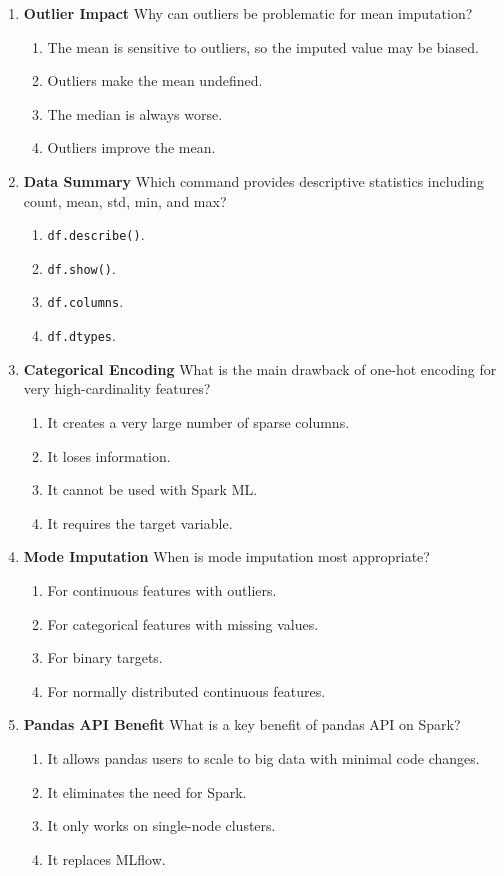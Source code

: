 \documentclass{article}
\begin{document}
\begin{enumerate}[label=\textbf{Q\arabic*.}]
		\item \textbf{Outlier Impact}
		Why can outliers be problematic for mean imputation?
		\begin{enumerate}[label=\Alph*.]
			\item The mean is sensitive to outliers, so the imputed value may be biased.
			\item Outliers make the mean undefined.
			\item The median is always worse.
			\item Outliers improve the mean.
		\end{enumerate}
		
		\item \textbf{Data Summary}
		Which command provides descriptive statistics including count, mean, std, min, and max?
		\begin{enumerate}[label=\Alph*.]
			\item \texttt{df.describe()}.
			\item \texttt{df.show()}.
			\item \texttt{df.columns}.
			\item \texttt{df.dtypes}.
		\end{enumerate}
		
		\item \textbf{Categorical Encoding}
		What is the main drawback of one-hot encoding for very high-cardinality features?
		\begin{enumerate}[label=\Alph*.]
			\item It creates a very large number of sparse columns.
			\item It loses information.
			\item It cannot be used with Spark ML.
			\item It requires the target variable.
		\end{enumerate}
		
		\item \textbf{Mode Imputation}
		When is mode imputation most appropriate?
		\begin{enumerate}[label=\Alph*.]
			\item For continuous features with outliers.
			\item For categorical features with missing values.
			\item For binary targets.
			\item For normally distributed continuous features.
		\end{enumerate}
		
		\item \textbf{Pandas API Benefit}
		What is a key benefit of pandas API on Spark?
		\begin{enumerate}[label=\Alph*.]
			\item It allows pandas users to scale to big data with minimal code changes.
			\item It eliminates the need for Spark.
			\item It only works on single-node clusters.
			\item It replaces MLflow.
		\end{enumerate}
		

\end{enumerate}
\end{document}
